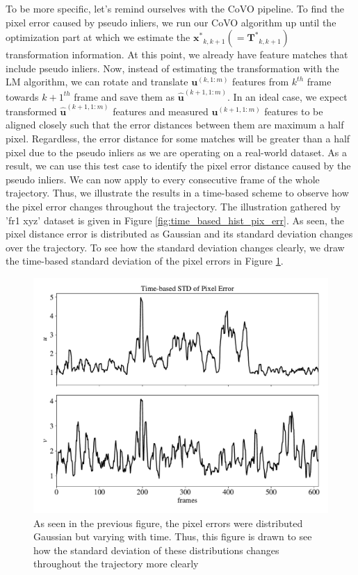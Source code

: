 \documentclass[a4paper]{report}
\numberwithin{figure}{section}
\begin{document}
To be more specific, let's remind ourselves with the CoVO pipeline.  To find 
the pixel error caused by pseudo inliers, we run our CoVO algorithm up until 
the optimization part at which we estimate the 
$\mathbf{x^*}_{k,k+1}(=\mathbf{T^*}_{k,k+1})$ transformation information.  At 
this point, we already have feature matches that include pseudo inliers.  Now, 
instead of estimating the transformation with the LM algorithm, we can rotate 
and translate $\mathbf{u}^{(k,1:m)}$ features from $k^{th}$ frame towards 
$k+1^{th}$ frame and save them as $\mathbf{\hat{u}}^{(k+1,1:m)}$.  In an ideal 
case, we expect transformed $\mathbf{\hat{u}}^{(k+1,1:m)}$ features and 
measured $\mathbf{u}^{(k+1,1:m)}$ features to be aligned closely such that the 
error distances between them are maximum a half pixel.  Regardless, the error 
distance for some matches will be greater than a half pixel due to the pseudo 
inliers as we are operating on a real-world dataset.  As a result, we can use 
this test case to identify the pixel error distance caused by the pseudo 
inliers.  We can now apply to every consecutive frame of the whole 
trajectory.  Thus, we illustrate the results in a time-based scheme to observe 
how the pixel error changes throughout the trajectory. The illustration 
gathered by 'fr1 xyz' dataset is given in Figure 
\ref{fig:time_based_hist_pix_err}.  As seen, the pixel distance error is 
distributed as Gaussian and its standard deviation changes over the 
trajectory.  To see how the standard deviation changes clearly, we draw the 
time-based standard deviation of the pixel errors in Figure 
\ref{fig:time_based_std_pix_err}.


\begin{figure}[H] \centering 
\includegraphics[width=0.8\linewidth,natwidth=640,natheight=640] 
{fig/eva_graphs/tum_fr1_xyz_tbased_uv_err_std.pdf} \caption[The Standard 
Deviations of Pixel Errors] {As seen in the previous figure, the pixel errors 
were distributed Gaussian but varying with time. Thus, this figure is drawn to 
see how the standard deviation of these distributions changes throughout the 
trajectory more clearly }\label{fig:time_based_std_pix_err} \end{figure}
\end{document}
